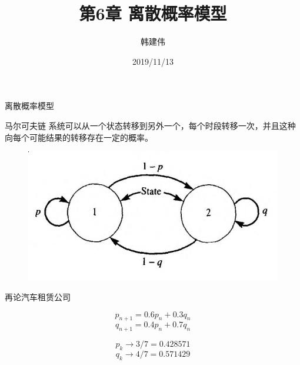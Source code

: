\documentclass[UTF8]{ctexbeamer}
\title{第6章 离散概率模型}
\author{韩建伟}
\institute{
  信息学院\\
  \texttt{hanjianwei@zjgsu.edu.cn}
}
\date{2019/11/13}
\begin{document}
\begin{frame}[plain]
  \titlepage{}
\end{frame}

\begin{frame}{离散概率模型}

  \begin{block}{马尔可夫链}
    系统可以从一个状态转移到另外一个，每个时段转移一次，并且这种向每个可能结果的转移存在一定的概率。
  \end{block}

  \begin{figure}
    \centering
    \includegraphics[width=0.6\textwidth{}]{markov.png}
  \end{figure}

\end{frame}

\begin{frame}{再论汽车租赁公司}
  \begin{figure}
    \centering
  \end{figure}

  \[
  p_{n+1} = 0.6p_n + 0.3q_n
  \]
  \[
  q_{n+1} = 0.4p_n + 0.7q_n
  \]

  \[
  p_k \rightarrow 3/7 = 0.428571
  \]
  \[
  q_k \rightarrow 4/7 = 0.571429
  \]
\end{frame}
\end{document}
